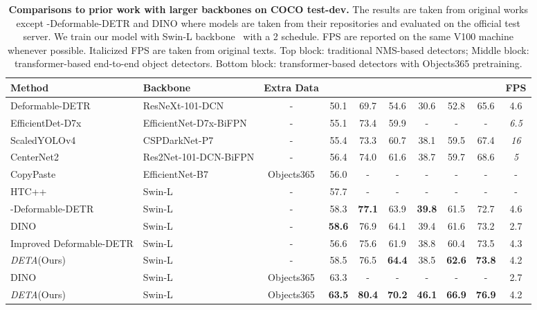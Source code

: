 \documentclass[10pt,twocolumn,letterpaper]{article}
\newcommand{\lbltbl}[1]{\label{tbl:#1}}
\def\name{{\textit{DETA}}\xspace}
\begin{document}
\begin{table*}
\centering
\begin{tabular}{@{}l@{\ }l@{\ }c@{\ \ \ \ }c@{\ \ \ \ }c@{\ \ \ \ }c@{\ \ \ \ }c@{\ \ \ \ }c@{\ \ \ \ }c@{\ \ \ \ }c@{}}
\toprule
Method       & Backbone & Extra Data &   &  &  &  &  &  & FPS \\
\toprule
Deformable-DETR~\cite{zhu2020deformable} & ResNeXt-101-DCN & - & 50.1 & 69.7 & 54.6 & 30.6 & 52.8 & 65.6 & 4.6 \\
EfficientDet-D7x~\cite{tan2020efficientdet} & EfficientNet-D7x-BiFPN & - & 55.1 & {73.4} & 59.9 & - & - & - & \textit{6.5} \\
ScaledYOLOv4~\cite{wang2020scaled} & CSPDarkNet-P7 & - & 55.4 & {73.3} & 60.7 & {38.1} & {59.5} & 67.4 & \textit{16}\\
CenterNet2~\cite{zhou2021probablistic} & Res2Net-101-DCN-BiFPN & - & 56.4 & 74.0 & 61.6 & 38.7 & 59.7 & 68.6 & \textit{5} \\
CopyPaste~\cite{ghiasi2021simple} & EfficientNet-B7 & Objects365 &  56.0 & - & - & - & - & - & - \\
HTC++~\cite{chen2019hybrid, liu2021swin} & Swin-L    & - & 57.7 & - & - & - &  - & - & - \\
\midrule
-Deformable-DETR~\cite{jia2022detrs}& Swin-L & - & 58.3 & \textbf{77.1} & 63.9 & \textbf{39.8} & 61.5 & 72.7 & 4.6 \\
DINO~\cite{zhang2022dino} & Swin-L & - & \textbf{58.6} & 76.9 & 64.1 & 39.4 & 61.6 & 73.2 & 2.7 \\
Improved Deformable-DETR  & Swin-L & - & 56.6 & 75.6 & 61.9 & 38.8 & 60.4 & 73.5 & 4.3 \\
\name (Ours)  & Swin-L & - & 58.5 & 76.5 & \textbf{64.4} & 38.5 & \textbf{62.6} & \textbf{73.8} & 4.2 \\
\midrule
DINO~\cite{zhang2022dino} & Swin-L & Objects365 & 63.3 & - & - & - & - & - & 2.7 \\
\name (Ours)  & Swin-L & Objects365 & \textbf{63.5} & \textbf{80.4} & \textbf{70.2} & \textbf{46.1} & \textbf{66.9} & \textbf{76.9} & 4.2 \\
\bottomrule
\end{tabular}
\caption{
\textbf{Comparisons to prior work with larger backbones on COCO test-dev.}
The results are taken from original works except -Deformable-DETR and DINO where models are taken from their repositories and evaluated on the official test server.
We train our model with Swin-L backbone~\cite{liu2021swin} with a 2 schedule.
FPS are reported on the same V100 machine whenever possible.
Italicized FPS are taken from original texts.
Top block: traditional NMS-based detectors; Middle block: transformer-based end-to-end object detectors. Bottom block: transformer-based detectors with Objects365 pretraining. 
}
\lbltbl{swin}
\end{table*}
\end{document}
